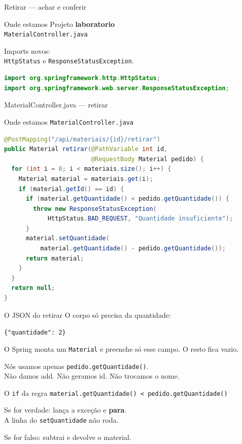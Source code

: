 \documentclass[aspectratio=169,11pt]{beamer}
\newcommand{\onde}[1]{%
  \begin{block}{Onde estamos}
    #1
  \end{block}
}
\begin{document}
\begin{frame}[fragile]{Retirar --- achar e conferir}
  \onde{Projeto \textbf{laboratorio}\\
        \texttt{MaterialController.java}}

  Imports novos:\\
  \texttt{HttpStatus} e \texttt{ResponseStatusException}.

\begin{lstlisting}[language=Java,basicstyle=\ttfamily\footnotesize]
import org.springframework.http.HttpStatus;
import org.springframework.web.server.ResponseStatusException;
\end{lstlisting}
\end{frame}

\begin{frame}[fragile]{MaterialController.java --- retirar}
  \onde{\texttt{MaterialController.java}}

\begin{lstlisting}[language=Java,basicstyle=\ttfamily\scriptsize]
@PostMapping("/api/materiais/{id}/retirar")
public Material retirar(@PathVariable int id,
                        @RequestBody Material pedido) {
  for (int i = 0; i < materiais.size(); i++) {
    Material material = materiais.get(i);
    if (material.getId() == id) {
      if (material.getQuantidade() < pedido.getQuantidade()) {
        throw new ResponseStatusException(
            HttpStatus.BAD_REQUEST, "Quantidade insuficiente");
      }
      material.setQuantidade(
          material.getQuantidade() - pedido.getQuantidade());
      return material;
    }
  }
  return null;
}
\end{lstlisting}
\end{frame}

\begin{frame}{O JSON do retirar}
  O corpo só precisa da quantidade:

  \vspace{0.3em}
  \texttt{\{"quantidade": 2\}}

  \vspace{0.5em}
  O Spring monta um \texttt{Material} e preenche
  só esse campo. O resto fica vazio.

  \vspace{0.5em}
  Nós usamos apenas \texttt{pedido.getQuantidade()}.\\
  Não damos add. Não geramos id. Não trocamos o nome.
\end{frame}

\begin{frame}{O \texttt{if} da regra}
  \texttt{material.getQuantidade() < pedido.getQuantidade()}

  \vspace{0.5em}
  Se for verdade: lança a exceção e \textbf{para}.\\
  A linha do \texttt{setQuantidade} não roda.

  \vspace{0.5em}
  Se for falso: subtrai e devolve o material.
\end{frame}
\end{document}
